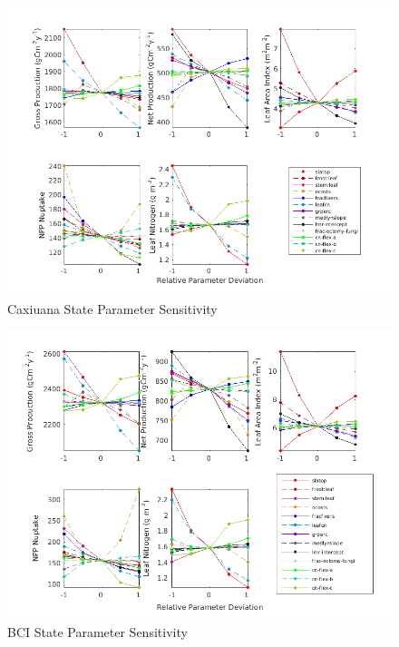 \documentclass[draft,linenumbers]{agujournal}
\begin{document}
 \begin{figure}[h]
     \centering
     \includegraphics[width=35pc]{matlab/figures/frac_deviation_p1CLM5_CAX__y1.png}
     \caption{Caxiuana State Parameter Sensitivity}
     \label{CAX state}
  \end{figure}
  
   \begin{figure}[h]
     \centering
     \includegraphics[width=35pc]{matlab/figures/frac_deviation_p1CLM5_BCI__y1.png}
     \caption{BCI State Parameter Sensitivity}
     \label{BCI state}
  \end{figure}
  
\end{document}
